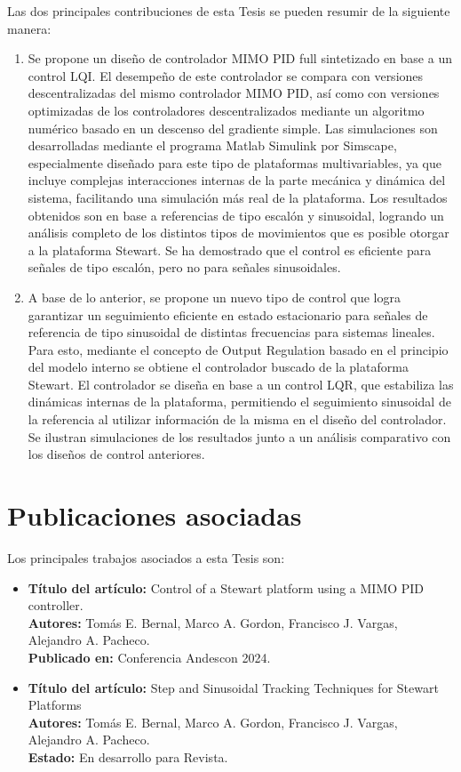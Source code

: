 Las dos principales contribuciones de esta Tesis se pueden resumir de la siguiente manera:
\begin{enumerate}
    \item Se propone un diseño de controlador MIMO PID full sintetizado en base a un control LQI. El desempeño de este controlador se compara con versiones descentralizadas del mismo controlador MIMO PID, así como con versiones optimizadas de los controladores descentralizados mediante un algoritmo numérico basado en un descenso del gradiente simple. Las simulaciones son desarrolladas mediante el programa Matlab Simulink por Simscape, especialmente diseñado para este tipo de plataformas multivariables, ya que incluye complejas interacciones internas de la parte mecánica y dinámica del sistema, facilitando una simulación más real de la plataforma. Los resultados obtenidos son en base a referencias de tipo escalón y sinusoidal, logrando un análisis completo de los distintos tipos de movimientos que es posible otorgar a la plataforma Stewart. Se ha demostrado que el control es eficiente para señales de tipo escalón, pero no para señales sinusoidales.
    
    \item A base de lo anterior, se propone un nuevo tipo de control que logra garantizar un seguimiento eficiente en estado estacionario para señales de referencia de tipo sinusoidal de distintas frecuencias para sistemas lineales. Para esto, mediante el concepto de Output Regulation basado en el principio del modelo interno se obtiene el controlador buscado de la plataforma Stewart. El controlador se diseña en base a un control LQR, que estabiliza las dinámicas internas de la plataforma, permitiendo el seguimiento sinusoidal de la referencia al utilizar información de la misma en el diseño del controlador. Se ilustran simulaciones de los resultados junto a un análisis comparativo con los diseños de control anteriores.
    
\end{enumerate}


\section{Publicaciones asociadas}

Los principales trabajos asociados a esta Tesis son:
\begin{itemize}
    \item \textbf{Título del artículo:} Control of a Stewart platform using a MIMO PID controller. \\
        \textbf{Autores:} Tomás E. Bernal, Marco A. Gordon, Francisco J. Vargas, Alejandro A. Pacheco. \\
        \textbf{Publicado en:} Conferencia Andescon 2024.
    \item \textbf{Título del artículo:} Step and Sinusoidal Tracking Techniques for Stewart Platforms \\ 
        \textbf{Autores:} Tomás E. Bernal, Marco A. Gordon, Francisco J. Vargas, Alejandro A. Pacheco. \\
        \textbf{Estado:} En desarrollo para Revista. 
\end{itemize}

